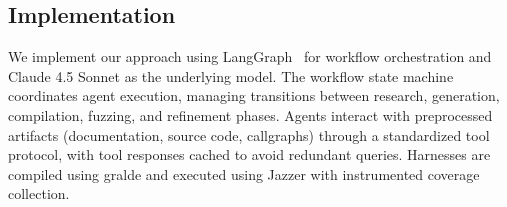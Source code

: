 \subsection{Implementation}%
\label{subsec:implementation}
We implement our approach using LangGraph~\cite{langgraph2024} for workflow orchestration and Claude 4.5 Sonnet as the underlying model. The workflow state machine coordinates agent execution, managing transitions between research, generation, compilation, fuzzing, and refinement phases. Agents interact with preprocessed artifacts (documentation, source code, callgraphs) through a standardized tool protocol, with tool responses cached to avoid redundant queries. Harnesses are compiled using gralde and executed using Jazzer with instrumented coverage collection.
